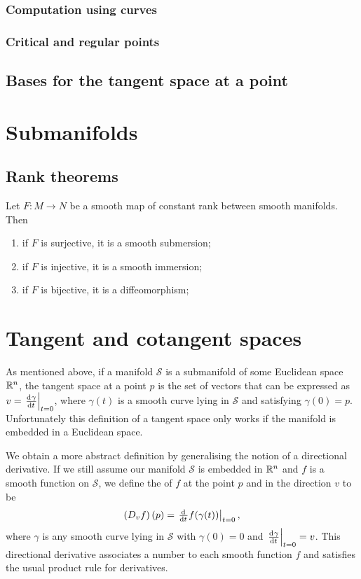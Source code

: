 \subsubsection{Computation using curves}

\subsubsection{Critical and regular points}

\subsection{Bases for the tangent space at a point}

\section{Submanifolds}

\subsection{Rank theorems}
\begin{theorem} \label{globalRank}
Let $F:M\to N$ be a smooth map of constant rank between smooth manifolds. Then
\begin{enumerate}
\item if $F$ is surjective, it is a smooth submersion;
\item if $F$ is injective, it is a smooth immersion;
\item if $F$ is bijective, it is a diffeomorphism;
\end{enumerate}
\end{theorem}

\section{Tangent and cotangent spaces}

As mentioned above, if a manifold $\mathcal{S}$ is a submanifold of some Euclidean space $\mathbb{R}^n$, the tangent space at a point $p$ is the set of vectors that can be expressed as $v = \left.\od{\gamma}{t}\right|_{t=0}$, where $\gamma(t)$ is a smooth curve lying in $\mathcal{S}$ and satisfying $\gamma(0) = p$. Unfortunately this definition of a tangent space only works if the manifold is embedded in a Euclidean space.

We obtain a more abstract definition by generalising the notion of a directional derivative. If we still assume our manifold $\mathcal{S}$ is embedded in $\mathbb{R}^n$ and $f$ is a smooth function on $\mathcal{S}$, we define the  of $f$ at the point $p$ and in the direction $v$ to be
\[ \left(D_vf\right)(p) = \left.\od{}{t}f(\gamma(t))\right|_{t=0}, \]
where $\gamma$ is any smooth curve lying in $\mathcal{S}$ with $\gamma(0) = 0$ and $\left.\od{\gamma}{t}\right|_{t=0} = v$. This directional derivative associates a number to each smooth function $f$ and satisfies the usual product rule for derivatives.


